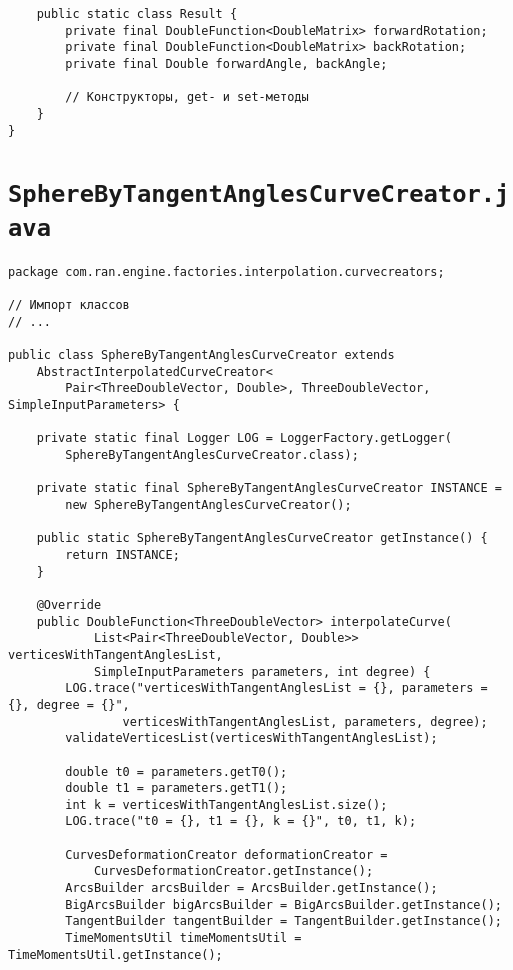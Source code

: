 \begin{verbatim}
    public static class Result {
        private final DoubleFunction<DoubleMatrix> forwardRotation;
        private final DoubleFunction<DoubleMatrix> backRotation;
        private final Double forwardAngle, backAngle;

        // Конструкторы, get- и set-методы
    }
}
\end{verbatim}

\section*{\texttt{SphereByTangentAnglesCurveCreator.java}}
\begin{verbatim}
package com.ran.engine.factories.interpolation.curvecreators;

// Импорт классов
// ...

public class SphereByTangentAnglesCurveCreator extends
    AbstractInterpolatedCurveCreator<
        Pair<ThreeDoubleVector, Double>, ThreeDoubleVector, SimpleInputParameters> {

    private static final Logger LOG = LoggerFactory.getLogger(
        SphereByTangentAnglesCurveCreator.class);

    private static final SphereByTangentAnglesCurveCreator INSTANCE =
        new SphereByTangentAnglesCurveCreator();

    public static SphereByTangentAnglesCurveCreator getInstance() {
        return INSTANCE;
    }

    @Override
    public DoubleFunction<ThreeDoubleVector> interpolateCurve(
            List<Pair<ThreeDoubleVector, Double>> verticesWithTangentAnglesList,
            SimpleInputParameters parameters, int degree) {
        LOG.trace("verticesWithTangentAnglesList = {}, parameters = {}, degree = {}",
                verticesWithTangentAnglesList, parameters, degree);
        validateVerticesList(verticesWithTangentAnglesList);

        double t0 = parameters.getT0();
        double t1 = parameters.getT1();
        int k = verticesWithTangentAnglesList.size();
        LOG.trace("t0 = {}, t1 = {}, k = {}", t0, t1, k);

        CurvesDeformationCreator deformationCreator =
            CurvesDeformationCreator.getInstance();
        ArcsBuilder arcsBuilder = ArcsBuilder.getInstance();
        BigArcsBuilder bigArcsBuilder = BigArcsBuilder.getInstance();
        TangentBuilder tangentBuilder = TangentBuilder.getInstance();
        TimeMomentsUtil timeMomentsUtil = TimeMomentsUtil.getInstance();


\end{verbatim}
